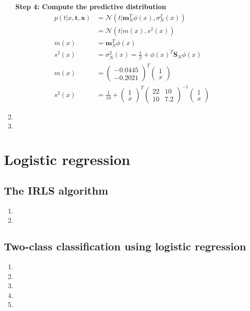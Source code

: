 \documentclass[paper=a4, fontsize=10pt]{scrartcl} %
\numberwithin{equation}{section} %
\numberwithin{figure}{section} %
\numberwithin{table}{section} %
\begin{document}
\begin{enumerate}
			\textbf{Step 4: Compute the predictive distribution}
			\begin{align}
				p(t \vert x, \boldsymbol t, \boldsymbol x) &= \mathcal{N}(t \vert \boldsymbol m_N^T \phi(x), \sigma^2_N(x))\\
														   &= \mathcal{N}(t \vert m(x), s^2(x))\\
				m(x) &= \boldsymbol m_N^T\phi(x) \\
				s^2(x) &= \sigma^2_N(x) = \frac{1}{\beta} + \phi(x)^T \boldsymbol S_N \phi(x)\\
				m(x) &= \begin{pmatrix}
							-0.0445\\
							-0.2021
						\end{pmatrix}^T
						\begin{pmatrix}
							1\\
							x
						\end{pmatrix}\\
				s^2(x) &= \frac{1}{10} + \begin{pmatrix}
											1\\
											x
										 \end{pmatrix}^T
										 \begin{pmatrix}
										 	22 & 10\\
										 	10 & 7.2
										 \end{pmatrix}^{-1}
										 \begin{pmatrix}
										 	1\\
										 	x
										 \end{pmatrix}
			\end{align}
	\item 
	\item
\end{enumerate}

\section{Logistic regression}
\subsection{The IRLS algorithm}
\begin{enumerate}
	\item 
	\item
\end{enumerate}

\subsection{Two-class classification using logistic regression}
\begin{enumerate}
	\item 
	\item
	\item
	\item
	\item
\end{enumerate}
\end{document}

